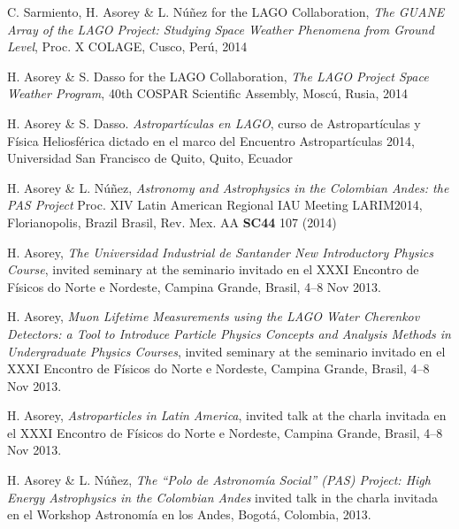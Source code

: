 \begin{etaremune}
\item {}C. Sarmiento, H. Asorey \& L. Núñez for the LAGO Collaboration, {\emph{The GUANE Array of the LAGO Project: Studying Space Weather Phenomena from Ground Level}}, \en Proc. X COLAGE, Cusco, Perú, 2014

\item {}H. Asorey \& S. Dasso for the LAGO Collaboration, {\emph{The LAGO Project Space Weather Program}}, \en 40th COSPAR Scientific Assembly, Moscú, Rusia, 2014

\item {}H. Asorey \& S. Dasso. {\emph{Astropartículas en LAGO}}, curso de Astropartículas y Física Heliosférica dictado en el marco del Encuentro Astropartículas 2014, Universidad San Francisco de Quito, Quito, Ecuador

\item {}H. Asorey \& L. Núñez, {\emph{Astronomy and Astrophysics in the Colombian Andes: the PAS Project}} \en Proc. XIV Latin American Regional IAU Meeting LARIM2014, Florianopolis, \ifeng Brazil \else Brasil\fi, Rev. Mex. AA {\bf{SC44}} 107 (2014)

\item {} H. Asorey, {\emph{The Universidad Industrial de Santander New Introductory Physics Course}}, 
\ifeng
invited seminary at the
\else
seminario invitado en el
\fi
XXXI Encontro de Físicos do Norte e Nordeste, Campina Grande, Brasil, 4--8 Nov 2013.

\item {} H. Asorey, {\emph{Muon Lifetime Measurements using the LAGO Water Cherenkov Detectors: a Tool to Introduce Particle Physics Concepts and Analysis Methods in Undergraduate Physics Courses}}, 
\ifeng
invited seminary at the
\else
seminario invitado en el
\fi
XXXI Encontro de Físicos do Norte e Nordeste, Campina Grande, Brasil, 4--8 Nov 2013.

\item {} H. Asorey, {\emph{Astroparticles in Latin America}}, 
\ifeng
invited talk at the
\else
charla invitada en el 
\fi
XXXI Encontro de Físicos do Norte e Nordeste, Campina Grande, Brasil, 4--8 Nov 2013.

\item {}H. Asorey \& L. Núñez, {\emph{The ``Polo de Astronomía Social'' (PAS) Project: High Energy Astrophysics in the Colombian Andes}} \ifeng invited talk in the \else charla invitada en el \fi Workshop Astronomía en los Andes, Bogotá, Colombia, 2013.
    

\end{etaremune}
